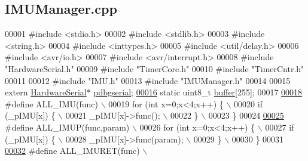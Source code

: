 \hypertarget{_i_m_u_manager_8cpp_source}{
\subsection{IMUManager.cpp}
}

\begin{DoxyCode}
00001 \textcolor{preprocessor}{#include <stdio.h>}
00002 \textcolor{preprocessor}{#include <stdlib.h>}
00003 \textcolor{preprocessor}{#include <string.h>}
00004 \textcolor{preprocessor}{#include <inttypes.h>}
00005 \textcolor{preprocessor}{#include <util/delay.h>}
00006 \textcolor{preprocessor}{#include <avr/io.h>}
00007 \textcolor{preprocessor}{#include <avr/interrupt.h>}
00008 \textcolor{preprocessor}{#include "HardwareSerial.h"}
00009 \textcolor{preprocessor}{#include "TimerCore.h"}
00010 \textcolor{preprocessor}{#include "TimerCntr.h"}
00011 
00012 \textcolor{preprocessor}{#include "IMU.h"}
00013 \textcolor{preprocessor}{#include "IMUManager.h"}
00014 
00015 \textcolor{keyword}{extern} \hyperlink{class_hardware_serial}{HardwareSerial}* \hyperlink{_gyro_acc_8cpp_a953e918236b1fd18b8f07bad1217ecbe}{pdbgserial};
\hypertarget{_i_m_u_manager_8cpp_source_l00016}{}\hyperlink{_i_m_u_manager_8cpp_a858e0513a46bec1d794f9487c41a969d}{00016} \textcolor{keyword}{static} uint8\_t  \hyperlink{_i_m_u_manager_8cpp_a858e0513a46bec1d794f9487c41a969d}{buffer}[255];
00017 
\hypertarget{_i_m_u_manager_8cpp_source_l00018}{}\hyperlink{_i_m_u_manager_8cpp_a1ad801a60513fb69f99c2732ca068726}{00018} \textcolor{preprocessor}{#define ALL\_IMU(func) \(\backslash\)}
00019 \textcolor{preprocessor}{    for (int x=0;x<4;x++) \{ \(\backslash\)}
00020 \textcolor{preprocessor}{        if (\_pIMU[x]) \{         \(\backslash\)}
00021 \textcolor{preprocessor}{            \_pIMU[x]->func();   \(\backslash\)}
00022 \textcolor{preprocessor}{        \}   \(\backslash\)}
00023 \textcolor{preprocessor}{    \}}
00024 \textcolor{preprocessor}{}
\hypertarget{_i_m_u_manager_8cpp_source_l00025}{}\hyperlink{_i_m_u_manager_8cpp_a3264743b07dd4d954bcd87d271d09fd6}{00025} \textcolor{preprocessor}{#define ALL\_IMUP(func,param) \(\backslash\)}
00026 \textcolor{preprocessor}{    for (int x=0;x<4;x++) \{ \(\backslash\)}
00027 \textcolor{preprocessor}{        if (\_pIMU[x]) \{         \(\backslash\)}
00028 \textcolor{preprocessor}{            \_pIMU[x]->func(param);   \(\backslash\)}
00029 \textcolor{preprocessor}{        \}   \(\backslash\)}
00030 \textcolor{preprocessor}{    \}}
00031 \textcolor{preprocessor}{}
\hypertarget{_i_m_u_manager_8cpp_source_l00032}{}\hyperlink{_i_m_u_manager_8cpp_a828c5d30222c335baef3647758f6847e}{00032} \textcolor{preprocessor}{#define ALL\_IMURET(func) \(\backslash\)}

\end{DoxyCode}
